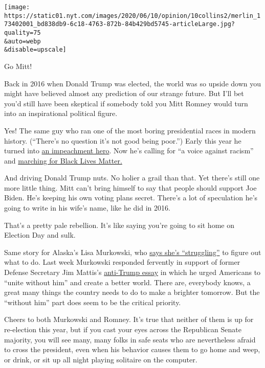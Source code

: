 \texttt{[image: https://static01.nyt.com/images/2020/06/10/opinion/10collins2/merlin\_173402001\_bd838db9-6c18-4763-872b-84b429bd5745-articleLarge.jpg?quality=75\\\&auto=webp\\\&disable=upscale]}

Go Mitt!

Back in 2016 when Donald Trump was elected, the world was so upside down
you might have believed almost any prediction of our strange future. But
I'll bet you'd still have been skeptical if somebody told you Mitt
Romney would turn into an inspirational political figure.

Yes! The same guy who ran one of the most boring presidential races in
modern history. (``There's no question it's not good being poor.'')
Early this year he turned into
\href{https://www.nytimes.com/2020/02/05/us/politics/romney-trump-impeachment.html}{an
impeachment hero}. Now he's calling for ``a voice against racism'' and
\href{https://www.nytimes.com/2020/06/07/us/politics/mitt-romney-george-floyd-protests.html}{marching
for Black Lives Matter.}

And driving Donald Trump nuts. No holier a grail than that. Yet there's
still one more little thing. Mitt can't bring himself to say that people
should support Joe Biden. He's keeping his own voting plans secret.
There's a lot of speculation he's going to write in his wife's name,
like he did in 2016.

That's a pretty pale rebellion. It's like saying you're going to sit
home on Election Day and sulk.

Same story for Alaska's Lisa Murkowski, who
\href{https://www.nytimes.com/2020/06/04/us/politics/murkowski-mattis-trump.html}{says
she's ``struggling''} to figure out what to do. Last week Murkowski
responded fervently in support of former Defense Secretary Jim Mattis's
\href{https://www.theatlantic.com/politics/archive/2020/06/james-mattis-denounces-trump-protests-militarization/612640/}{anti-Trump
essay} in which he urged Americans to ``unite without him'' and create a
better world. There are, everybody knows, a great many things the
country needs to do to make a brighter tomorrow. But the ``without him''
part does seem to be the critical priority.

Cheers to both Murkowski and Romney. It's true that neither of them is
up for re-election this year, but if you cast your eyes across the
Republican Senate majority, you will see many, many folks in safe seats
who are nevertheless afraid to cross the president, even when his
behavior causes them to go home and weep, or drink, or sit up all night
playing solitaire on the computer.

